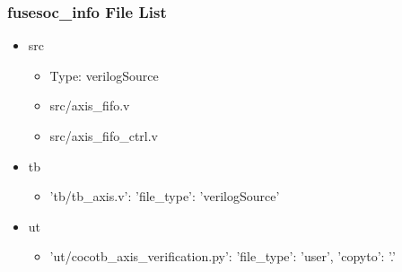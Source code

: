 \subsubsection{fusesoc\_info File List}
\begin{itemize}
\item src
	\begin{itemize}
	\item[$\space$] Type: verilogSource
	\item src/axis\_fifo.v
	\item src/axis\_fifo\_ctrl.v
	\end{itemize}
\item tb
	\begin{itemize}
	\item {'tb/tb\_axis.v': {'file\_type': 'verilogSource'}}
	\end{itemize}
\item ut
	\begin{itemize}
	\item {'ut/cocotb\_axis\_verification.py': {'file\_type': 'user', 'copyto': '.'}}
	\end{itemize}
\end{itemize}
